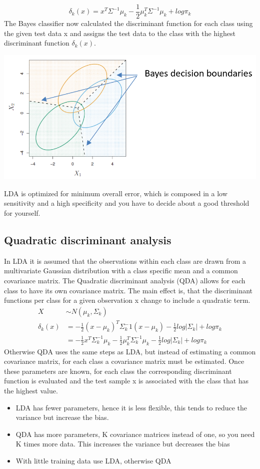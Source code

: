 \documentclass[../document.tex]{subfiles}
\begin{document}
	\begin{equation}
		\delta_{k}(x)=x^T\Sigma^{-1}\mu_{k}-\frac{1}{2}\mu_{k}^T\Sigma^{-1}\mu_{k}+log\pi_{k}
	\end{equation}
	The Bayes classifier now calculated the discriminant function for each class using the given test data x and assigns the test data to the class with the highest discriminant function $\delta_{k}(x)$.\\
	\begin{center}
		\includegraphics[width=.5\textwidth]{pictures/mlda}
	\end{center}
	LDA is optimized for minimum overall error, which is composed in a low sensitivity and a high specificity and you have to decide about a good threshold for yourself.

	\subsection{Quadratic discriminant analysis}
	In LDA it is assumed that the observations within each class are drawn from a multivariate Gaussian distribution with a class specific mean and a common covariance matrix. The Quadratic discriminant analysis (QDA) allows for each class to have its own covariance matrix. The main effect is, that the discriminant functions per class for a given observation x change to include a quadratic term.
	\begin{equation}
	\begin{split}
		X&\sim N(\mu_{k},\Sigma_{k})\\
		\delta_{k}(x)&=-\frac{1}{2}(x-\mu_{k})^T\Sigma_{k}^-1(x-\mu_{k})-\frac{1}{2}log|\Sigma_{k}|+log\pi_{k}\\
		&=-\frac{1}{2}x^T\Sigma_{k}^{-1}\mu_{k}-\frac{1}{2}\mu_{k}^T\Sigma_{k}^{-1}\mu_{k}-\frac{1}{2}log|\Sigma_{k}|+log\pi_{k}
	\end{split}
	\end{equation}
	Otherwise QDA uses the same steps as LDA, but instead of estimating a common covariance matrix, for each class a covariance matrix must be estimated. Once these parameters are known, for each class the corresponding discriminant function is evaluated and the test sample x is associated with the class that has the highest value.\\
	\begin{itemize}
		\item LDA has fewer parameters, hence it is less flexible, this tends to reduce the variance but increase the bias.
		\item QDA has more parameters, K covariance matrices instead of one, so you need K times more data. This increases the variance but decreases the bias
		\item With little training data use LDA, otherwise QDA
	\end{itemize}
\end{document}
